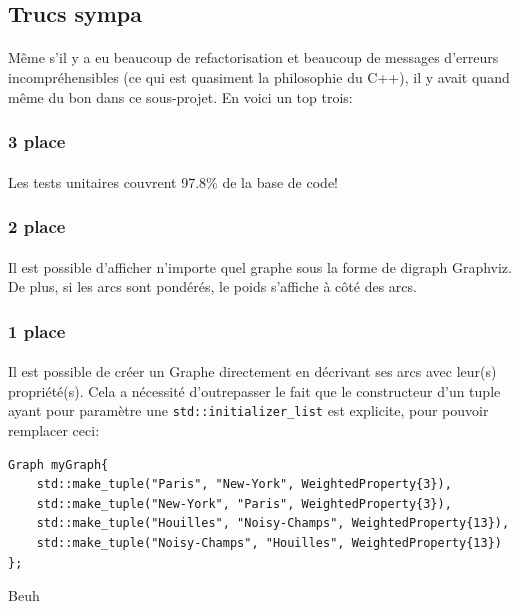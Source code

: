 \documentclass[french]{article}
\begin{document}
\subsection{Trucs sympa}

\paragraph{} Même s'il y a eu beaucoup de refactorisation et beaucoup de
messages d'erreurs incompréhensibles (ce qui est quasiment la philosophie du
C++), il y avait quand même du bon dans ce sous-projet. En voici un top trois:

\subsubsection{3\ieme{} place}

\paragraph{} Les tests unitaires couvrent 97.8\% de la base de code!  {\huge
	\Smiley{}}

\subsubsection{2\ieme{} place}

\paragraph{} Il est possible d'afficher n'importe quel graphe sous la forme de
digraph Graphviz. De plus, si les arcs sont pondérés, le poids s'affiche à côté
des arcs.

\subsubsection{1\iere{} place}

\paragraph{} Il est possible de créer un Graphe directement en décrivant ses
arcs avec leur(s) propriété(s). Cela a nécessité d'outrepasser le fait que le
constructeur d'un tuple ayant pour paramètre une
\texttt{std::initializer_list} est explicite, pour pouvoir remplacer
ceci:

\begin{listing}[H]
\begin{verbatim}
Graph myGraph{
	std::make_tuple("Paris", "New-York", WeightedProperty{3}),
	std::make_tuple("New-York", "Paris", WeightedProperty{3}),
	std::make_tuple("Houilles", "Noisy-Champs", WeightedProperty{13}),
	std::make_tuple("Noisy-Champs", "Houilles", WeightedProperty{13})
};
\end{verbatim}
\caption{Beuh}
\label{tsp:beuh}
\end{listing}
\end{document}
